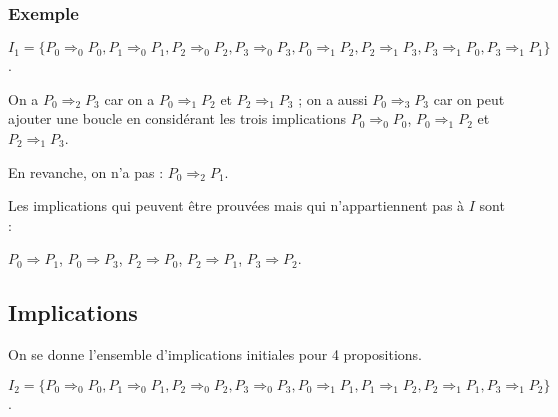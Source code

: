 \subsubsection*{Exemple}
$I_1=\{P_{0}\Rightarrow_{0}P_{0}, P_{1}\Rightarrow_{0}P_{1}, P_{2}\Rightarrow_{0}P_{2}, 
     P_{3}\Rightarrow_{0}P_{3}, P_{0}\Rightarrow_{1}P_{2}, P_{2}\Rightarrow_{1}P_{3}, 
     P_{3}\Rightarrow_{1}P_{0}, P_{3}\Rightarrow_{1}P_{1}\}$.

On a $P_{0} \Rightarrow_2 P_{3}$ car on a
$P_{0} \Rightarrow_{1} P_{2}$ et $P_{2} \Rightarrow_{1} P_{3}$ ;
on a aussi $P_{0} \Rightarrow_3 P_{3}$ car on peut ajouter une boucle
en considérant les trois implications $P_{0} \Rightarrow_{0} P_{0}$,
$P_{0} \Rightarrow_{1} P_{2}$ et $P_{2} \Rightarrow_{1} P_{3}$.

En revanche, on n'a pas : $P_{0} \Rightarrow_2 P_{1}$.

Les implications qui peuvent être prouvées mais qui n'appartiennent pas à $I$ sont : 

$P_{0} \Rightarrow P_{1}$, $P_{0} \Rightarrow P_{3}$,  $P_{2} \Rightarrow P_{0}$, $P_{2} \Rightarrow P_{1}$,
$P_{3} \Rightarrow P_{2}$.
\subsection{Implications}
On se donne l'ensemble d'implications initiales pour 4 propositions.

$I_2=\{P_{0}\Rightarrow_{0}P_{0},
P_{1}\Rightarrow_{0}P_{1}, P_{2}\Rightarrow_{0}P_{2},
P_{3}\Rightarrow_{0}P_{3}, P_{0}\Rightarrow_{1}P_{1},
P_{1}\Rightarrow_{1}P_{2}, P_{2} \Rightarrow_{1} P_{1},
P_{3} \Rightarrow_{1} P_{2}\}$.

